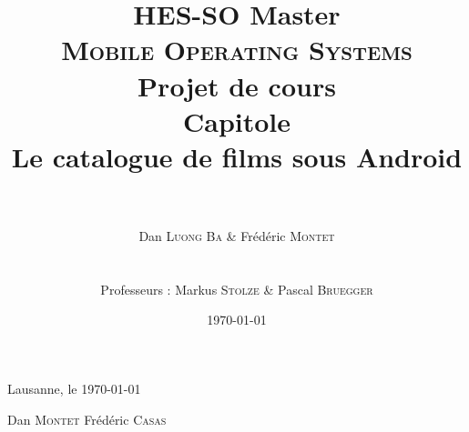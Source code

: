 \documentclass[a4paper, 11pt]{report}
\title{\huge{HES-SO Master} \\ \Huge{\textbf{\textsc{Mobile Operating Systems}}} \\
\LARGE{Projet de cours} \\
\vspace{2cm} \huge{\textbf{Capitole}} \\
\vspace{1cm} \Large{Le catalogue de films sous Android} }
\author{\\ \\ Dan \textsc{Luong Ba} \& Frédéric \textsc{Montet} \\
\\ \\
Professeurs : Markus \textsc{Stolze} \& Pascal \textsc{Bruegger} \\
}
\date{\today}
\begin{document}
\maketitle %
\newpage

\tableofcontents
\newpage







\vspace{3cm}
Lausanne, le \today

\vspace{1.5cm}

\hspace{2cm} Dan \textsc{Montet}
\hspace{5cm} Frédéric \textsc{Casas}

\vspace{2cm}


%
%


%
\end{document}
